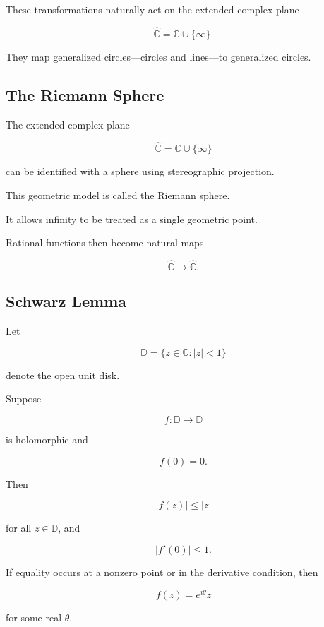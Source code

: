 These transformations naturally act on the extended complex plane

\[
\boxed{
\widehat{\mathbb{C}}
=
\mathbb{C}\cup\{\infty\}.
}
\]

They map generalized circles---circles and lines---to generalized circles.

\subsection{The Riemann Sphere}
\label{subsec:riemann-sphere}

The extended complex plane

\[
\widehat{\mathbb{C}}
=
\mathbb{C}\cup\{\infty\}
\]

can be identified with a sphere using stereographic projection.

This geometric model is called the Riemann sphere.

It allows infinity to be treated as a single geometric point.

Rational functions then become natural maps

\[
\boxed{
\widehat{\mathbb{C}}
\to
\widehat{\mathbb{C}}.
}
\]

\subsection{Schwarz Lemma}
\label{subsec:schwarz-lemma}

Let

\[
\mathbb{D}
=
\{z\in\mathbb{C}:|z|<1\}
\]

denote the open unit disk.

\begin{theorem}
Suppose

\[
f:\mathbb{D}\to\mathbb{D}
\]

is holomorphic and

\[
f(0)=0.
\]

Then

\[
\boxed{
|f(z)|\leq|z|
}
\]

for all \(z\in\mathbb{D}\), and

\[
\boxed{
|f'(0)|\leq1.
}
\]

If equality occurs at a nonzero point or in the derivative condition, then

\[
f(z)=e^{i\theta}z
\]

for some real \(\theta\).
\end{theorem}

